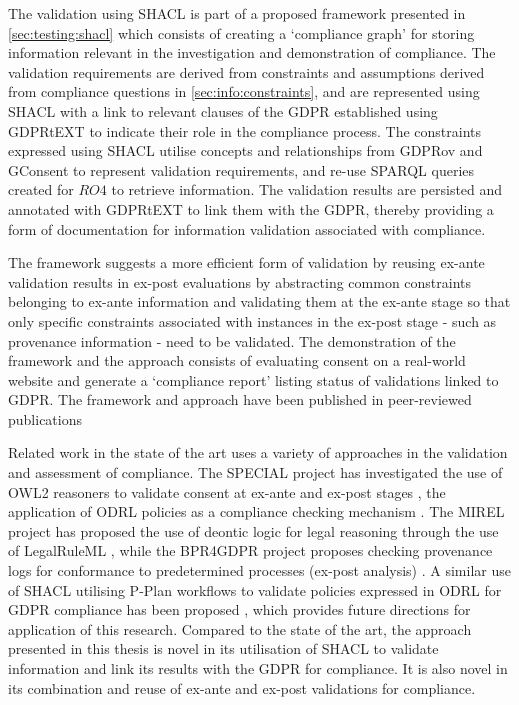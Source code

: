 The validation using SHACL is part of a proposed framework presented in \autoref{sec:testing:shacl} which consists of creating a `compliance graph' for storing information relevant in the investigation and demonstration of compliance.
The validation requirements are derived from constraints and assumptions derived from compliance questions in \autoref{sec:info:constraints}, and are represented using SHACL with a link to relevant clauses of the GDPR established using GDPRtEXT to indicate their role in the compliance process.
The constraints expressed using SHACL utilise concepts and relationships from GDPRov and GConsent to represent validation requirements, and re-use SPARQL queries created for $RO4$ to retrieve information.
The validation results are persisted and annotated with GDPRtEXT to link them with the GDPR, thereby providing a form of documentation for information validation associated with compliance.

The framework suggests a more efficient form of validation by reusing ex-ante validation results in ex-post evaluations by abstracting common constraints belonging to ex-ante information and validating them at the ex-ante stage so that only specific constraints associated with instances in the ex-post stage - such as provenance information - need to be validated.
The demonstration of the framework and the approach consists of evaluating consent on a real-world website and generate a `compliance report' listing status of validations linked to GDPR.
The framework and approach have been published in peer-reviewed publications \cite{pandit_towards_2018,pandit_exploring_2018,pandit_test-driven_2019}

Related work in the state of the art uses a variety of approaches in the validation and assessment of compliance. The SPECIAL project has investigated the use of OWL2 reasoners to validate consent at ex-ante and ex-post stages \cite{bonatti_fast_2018,dullaert_d3.4_2019}, the application of ODRL policies as a compliance checking mechanism \cite{agarwal_legislative_2018,vos_odrl_2019}. The MIREL project has proposed the use of deontic logic for legal reasoning through the use of LegalRuleML \cite{palmirani_pronto:_2018,monica_modelling_2018}, while the BPR4GDPR project proposes checking provenance logs for conformance to predetermined processes (ex-post analysis) \cite{mehr_compliance_2019}.
A similar use of SHACL utilising P-Plan workflows to validate policies expressed in ODRL for GDPR compliance has been proposed \cite{lieber_policy-compliant_2019}, which provides future directions for application of this research.
Compared to the state of the art, the approach presented in this thesis is novel in its utilisation of SHACL to validate information and link its results with the GDPR for compliance. It is also novel in its combination and reuse of ex-ante and ex-post validations for compliance.

